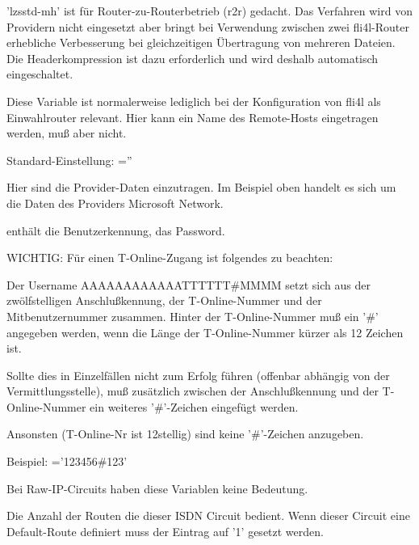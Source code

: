 \begin{description}
  'lzsstd-mh' ist für Router-zu-Routerbetrieb (r2r) gedacht. Das Verfahren
  wird von Providern nicht eingesetzt aber bringt bei Verwendung zwischen
  zwei fli4l-Router erhebliche Verbesserung bei gleichzeitigen Übertragung
  von mehreren Dateien. Die Headerkompression ist dazu erforderlich und wird
  deshalb automatisch eingeschaltet.

  
  Diese Variable ist normalerweise lediglich bei der Konfiguration von
  fli4l als Einwahlrouter relevant. Hier kann ein Name des
  Remote-Hosts eingetragen werden, muß aber nicht.
  
  Standard-Einstellung: =''

  
  Hier sind die Provider-Daten einzutragen. Im Beispiel oben handelt
  es sich um die Daten des Providers Microsoft Network.
  
   enthält die Benutzerkennung, 
  das Password.
  
  WICHTIG:  Für einen T-Online-Zugang ist folgendes zu beachten:
  
  Der Username AAAAAAAAAAAATTTTTT\#MMMM setzt sich aus der
  zwölfstelligen Anschlußkennung, der T-Online-Nummer und der
  Mitbenutzernummer zusammen.  Hinter der T-Online-Nummer muß ein '\#'
  angegeben werden, wenn die Länge der T-Online-Nummer kürzer als 12
  Zeichen ist.
  
  Sollte dies in Einzelfällen nicht zum Erfolg führen (offenbar
  abhängig von der Vermittlungsstelle), muß zusätzlich zwischen der
  Anschlußkennung und der T-Online-Nummer ein weiteres '\#'-Zeichen
  eingefügt werden.
  
  Ansonsten (T-Online-Nr ist 12stellig) sind keine '\#'-Zeichen
  anzugeben.
  
  Beispiel:  ='123456\#123'

  
  Bei Raw-IP-Circuits haben diese Variablen keine Bedeutung.


  Die Anzahl der Routen die dieser ISDN Circuit bedient. Wenn dieser
  Circuit eine Default-Route definiert muss der Eintrag auf '1'
  gesetzt werden.


\end{description}
